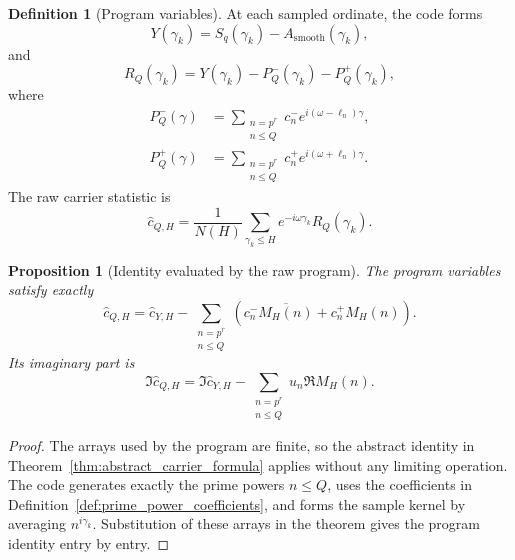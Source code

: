 \documentclass[11pt]{amsart}
\numberwithin{equation}{section}
\theoremstyle{plain}
\newtheorem{proposition}[theorem]{Proposition}
\theoremstyle{definition}
\newtheorem{definition}[theorem]{Definition}
\theoremstyle{remark}
\newcommand{\1}{\mathbf{1}}
\begin{document}
\begin{definition}[Program variables]
\label{def:numerical_program_variables}
At each sampled ordinate, the code forms
\begin{equation}
Y(\gamma_k)
=
S_q(\gamma_k)-A_{\mathrm{smooth}}(\gamma_k),
\label{eq:numerical_Y_program}
\end{equation}
and
\begin{equation}
R_Q(\gamma_k)
=
Y(\gamma_k)-P_Q^-(\gamma_k)-P_Q^+(\gamma_k),
\label{eq:numerical_RQ_program}
\end{equation}
where
\begin{align}
P_Q^-(\gamma)
&=
\sum_{\substack{n=p^r\\n\leq Q}}
 c_n^-e^{i(\omega-\ell_n)\gamma},
\label{eq:numerical_PQ_minus}
\\
P_Q^+(\gamma)
&=
\sum_{\substack{n=p^r\\n\leq Q}}
 c_n^+e^{i(\omega+\ell_n)\gamma}.
\label{eq:numerical_PQ_plus}
\end{align}
The raw carrier statistic is
\begin{equation}
\widehat c_{Q,H}
=
\frac1{N(H)}
\sum_{\gamma_k\leq H}
e^{-i\omega\gamma_k}R_Q(\gamma_k).
\label{eq:numerical_raw_carrier}
\end{equation}
\end{definition}

\begin{proposition}[Identity evaluated by the raw program]
\label{prop:numerical_raw_identity}
The program variables satisfy exactly
\begin{equation}
\widehat c_{Q,H}
=
\widehat c_{Y,H}
-
\sum_{\substack{n=p^r\\n\leq Q}}
\left(c_n^-\overline{M_H(n)}+c_n^+M_H(n)\right).
\label{eq:numerical_raw_identity}
\end{equation}
Its imaginary part is
\begin{equation}
\Im\widehat c_{Q,H}
=
\Im\widehat c_{Y,H}
-
\sum_{\substack{n=p^r\\n\leq Q}}
u_n\Re M_H(n).
\label{eq:numerical_imag_identity}
\end{equation}
\end{proposition}

\begin{proof}
The arrays used by the program are finite, so the abstract identity in
Theorem~\ref{thm:abstract_carrier_formula} applies without any limiting
operation.  The code generates exactly the prime powers \(n\leq Q\), uses
the coefficients in Definition~\ref{def:prime_power_coefficients}, and
forms the sample kernel by averaging \(n^{i\gamma_k}\).  Substitution of
these arrays in the theorem gives the program identity entry by entry.
\end{proof}
\end{document}
